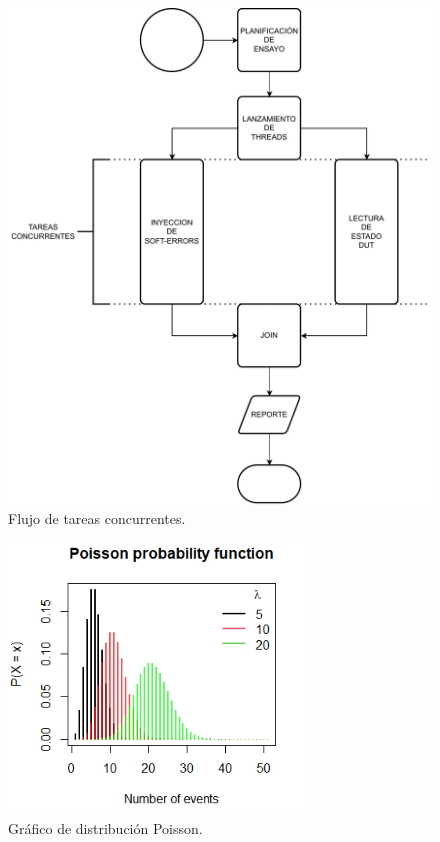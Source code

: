 \begin{figure}[htbp]
	\centering
	\includegraphics[width=\textwidth]{./Figures/concurrencia.pdf}
    \caption{Flujo de tareas concurrentes.}
	\label{fig:concurrencia}
\end{figure}

\begin{figure}[htbp]
	\centering
	\includegraphics[width=0.7\textwidth]{./Figures/poisson.png}
    \caption{Gráfico de distribución Poisson\citep{WEBSITE:poisson}.}
	\label{fig:poisson}
\end{figure}

